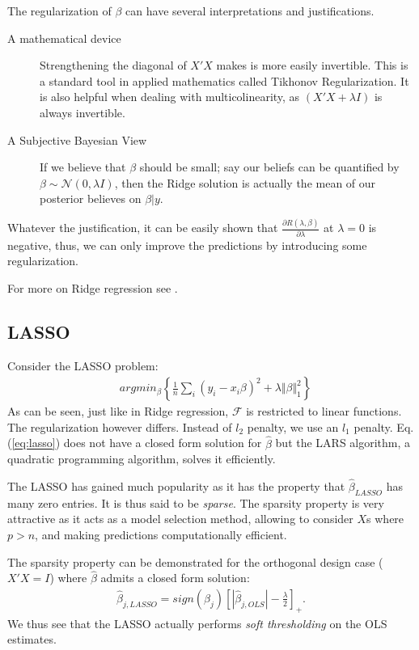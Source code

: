 \documentclass[12pt,a4paper]{article}
\theoremstyle{plain}
\theoremstyle{definition}
\newcommand{\gauss}[1]{\mathcal{N}\left(#1\right)}
\newcommand{\norm}[1]{\Vert #1 \Vert}
\newcommand{\risk}{R}
\newcommand{\deriv}[2]{\frac{\partial #1}{\partial #2}}
\newcommand{\argmin}[2]{argmin_{#1}\left\{ #2 \right\}}
\newcommand{\hypclass}{\mathcal{F}}
\begin{document}
The regularization of $\beta$ can have several interpretations and justifications.
\begin{description}
\item[A mathematical device] Strengthening the diagonal of $X'X$ makes is more easily invertible. This is a standard tool in applied mathematics called Tikhonov Regularization. It is also helpful when dealing with multicolinearity, as $(X'X+\lambda I)$ is always invertible.
\item[A Subjective Bayesian View] If we believe that $\beta$ should be small; say our beliefs can be quantified by $\beta \sim \gauss{0,\lambda I}$, then the Ridge solution is actually the mean of our posterior believes on $\beta|y$.
\end{description}

Whatever the justification, it can be easily shown that $\deriv{\risk(\lambda,\beta)}{\lambda}$ at $\lambda=0$ is negative, thus, we can only improve the predictions by introducing some regularization.


For more on Ridge regression see \cite{hastie_elements_2003}.


\subsection{LASSO}
Consider the LASSO problem:
\begin{align}
\label{eq:lasso}
	& \argmin{\beta}{\frac{1}{n}\sum_i (y_i-x_i\beta)^2 + \lambda \norm{\beta}^2_1} 
\end{align}
As can be seen, just like in Ridge regression, $\hypclass$ is restricted to linear functions. The regularization however differs. Instead of $l_2$ penalty, we use an $l_1$ penalty.
Eq.(\ref{eq:lasso}) does not have a closed form solution for $\hat{\beta}$ but the LARS algorithm, a quadratic programming algorithm, solves it efficiently.



The LASSO has gained much popularity as it has the property that $\hat{\beta}_{LASSO}$ has many zero entries. It is thus said to be \emph{sparse}.
The sparsity property is very attractive as it acts as a model selection method, allowing to consider $X$s where $p>n$, and making predictions computationally efficient.

The sparsity property can be demonstrated for the orthogonal design case ($X'X=I$) where $\hat{\beta}$ admits a closed form solution:
\begin{align}
	\hat{\beta}_{j,LASSO} = sign(\beta_j) \left[|\hat{\beta}_{j,OLS}|-\frac{\lambda}{2} \right]_+.
\end{align}
We thus see that the LASSO actually performs \emph{soft thresholding} on the OLS estimates. 
\end{document}
